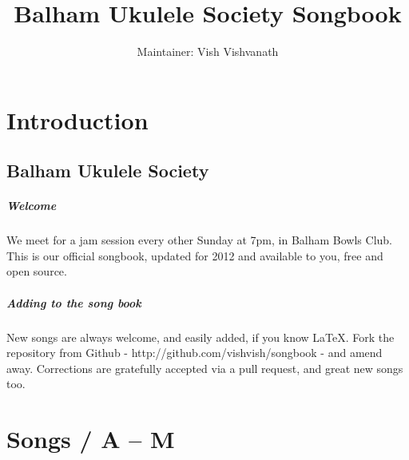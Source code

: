\documentclass[11pt,a4paper]{book}
\title{Balham Ukulele Society Songbook}
\author{Maintainer: Vish Vishvanath}
\begin{document}
\pagestyle{plain}
\maketitle
\restoregeometry

\dominitoc
\dominilof
\dominilot
\tableofcontents

\setcounter{page}{1}


\chapter{Introduction}\label{ch:introduction}
\section{Balham Ukulele Society} %
\label{sec:balham_ukulele_society}

\paragraph{Welcome} %
\label{par:welcome}
We meet for a jam session every other Sunday at 7pm, in Balham Bowls Club. This is our official songbook, updated for 2012 and available to you, free and open source.

\paragraph{Adding to the song book} %
\label{par:adding_to_the_song_book}

New songs are always welcome, and easily added, if you know \LaTeX. Fork the repository from Github - http://github.com/vishvish/songbook - and amend away. Corrections are gratefully accepted via a pull request, and great new songs too.


\chapter{Songs / A -- M}
\label{ch:songs_a_m}
\minitoc
\Large
\linenumbers







\end{document}
